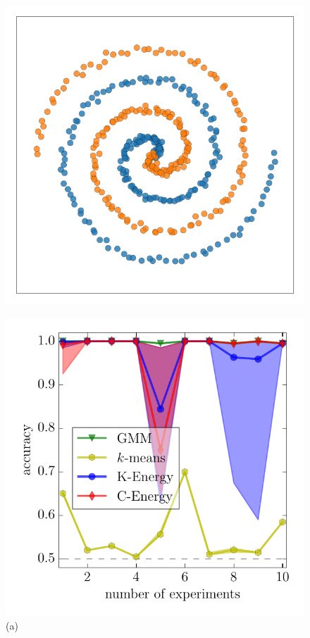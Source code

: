 \documentclass[aps,preprint,nofootinbib,floatfix]{revtex4-1}
\begin{document}
\begin{figure}
\begin{minipage}{0.33\textwidth}
\hspace{.7cm}\includegraphics[width=.82\textwidth]{spirals_data.pdf}
\end{minipage}
\begin{minipage}{0.33\textwidth}
\centering
\includegraphics[width=\textwidth]{cigars.pdf}\\[-.8em]
(a)
\end{minipage}

\end{figure}
\end{document}

